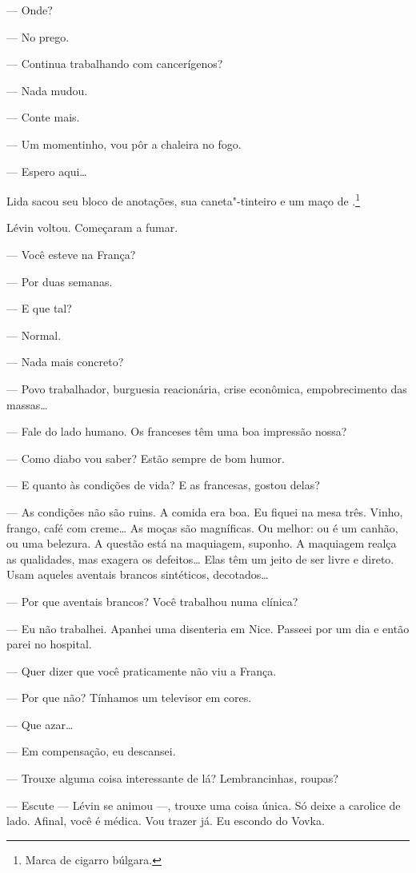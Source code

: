 --- Onde?

--- No prego.

--- Continua trabalhando com cancerígenos?

--- Nada mudou.

--- Conte mais.

--- Um momentinho, vou pôr a chaleira no fogo.

--- Espero aqui\ldots{}

Lida sacou seu bloco de anotações, sua caneta"-tinteiro e um maço de
.\footnote{Marca de cigarro búlgara.}

Lévin voltou. Começaram a fumar.

--- Você esteve na França?

--- Por duas semanas.

--- E que tal?

--- Normal.

--- Nada mais concreto?

--- Povo trabalhador, burguesia reacionária, crise econômica,
empobrecimento das massas\ldots{}

--- Fale do lado humano. Os franceses têm uma boa impressão nossa?

--- Como diabo vou saber? Estão sempre de bom humor.

--- E quanto às condições de vida? E as francesas, gostou delas?

--- As condições não são ruins. A comida era boa. Eu fiquei na mesa
três. Vinho, frango, café com creme\ldots{} As moças são magníficas. Ou
melhor: ou é um canhão, ou uma belezura. A questão está na maquiagem,
suponho. A maquiagem realça as qualidades, mas exagera os defeitos\ldots{}
Elas têm um jeito de ser livre e direto. Usam aqueles aventais brancos
sintéticos, decotados\ldots{}

--- Por que aventais brancos? Você trabalhou numa clínica?

--- Eu não trabalhei. Apanhei uma disenteria em Nice. Passeei por um dia
e então parei no hospital.

--- Quer dizer que você praticamente não viu a França.

--- Por que não? Tínhamos um televisor em cores.

--- Que azar\ldots{}

--- Em compensação, eu descansei.

--- Trouxe alguma coisa interessante de lá? Lembrancinhas, roupas?

--- Escute --- Lévin se animou ---, trouxe uma coisa única. Só deixe a
carolice de lado. Afinal, você é médica. Vou trazer já. Eu escondo do
Vovka.

